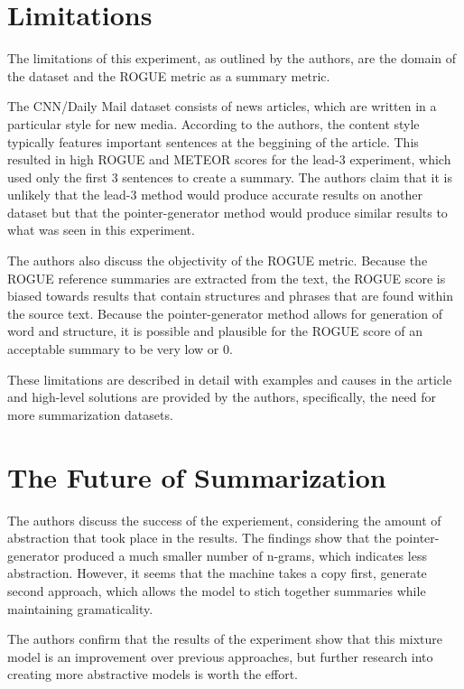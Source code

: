\documentclass[11pt]{article}
\begin{document}
\section{Limitations}

The limitations of this experiment, as outlined by the authors, are the domain of the dataset and the ROGUE metric as a summary metric. 

The CNN/Daily Mail dataset consists of news articles, which are written in a particular style for new media. According to the authors, the content style typically features important sentences at the beggining of the article. This resulted in high ROGUE and METEOR scores for the lead-3 experiment, which used only the first 3 sentences to create a summary. The authors claim that it is unlikely that the lead-3 method would produce accurate results on another dataset but that the pointer-generator method would produce similar results to what was seen in this experiment. 

The authors also discuss the objectivity of the ROGUE metric. Because the ROGUE reference summaries are extracted from the text, the ROGUE score is biased towards results that contain structures and phrases that are found within the source text. Because the pointer-generator method allows for generation of word and structure, it is possible and plausible for the ROGUE score of an acceptable summary to be very low or 0. 

These limitations are described in detail with examples and causes in the article and high-level solutions are provided by the authors, specifically, the need for more summarization datasets. 

\section{The Future of Summarization}

The authors discuss the success of the experiement, considering the amount of abstraction that took place in the results. The findings show that the pointer-generator produced a much smaller number of n-grams, which indicates less abstraction. However, it seems that the machine takes a copy first, generate second approach, which  allows the model to stich together summaries while maintaining gramaticality. 

The authors confirm that the results of the experiment show that this mixture model is an improvement over previous approaches, but further research into creating more abstractive models is worth the effort. 
\end{document}
